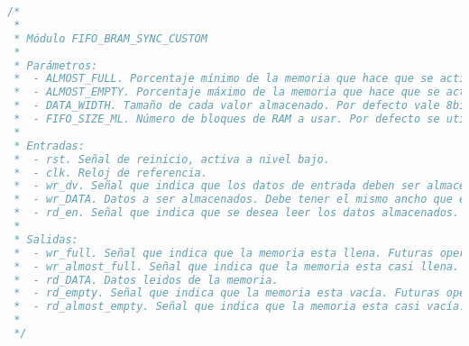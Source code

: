 \begin{lstlisting}[language=Verilog,
    caption={Parámetros, entradas y salidas del módulo FIFO\_BRAM\_SYNC\_CUSTOM.},
    label=src:resultados-modulos-fifo]
/*
 *
 * Módulo FIFO_BRAM_SYNC_CUSTOM
 *
 * Parámetros:
 *  - ALMOST_FULL. Porcentaje mínimo de la memoria que hace que se active la señal wr_almost_full. Por defecto vale 0.9.
 *  - ALMOST_EMPTY. Porcentaje máximo de la memoria que hace que se active la señal rd_almost_empty. Por defecto vale 0.1.
 *  - DATA_WIDTH. Tamaño de cada valor almacenado. Por defecto vale 8bits.
 *  - FIFO_SIZE_ML. Número de bloques de RAM a usar. Por defecto se utiliza uno.
 *
 * Entradas:
 *  - rst. Señal de reinicio, activa a nivel bajo.
 *  - clk. Reloj de referencia.
 *  - wr_dv. Señal que indica que los datos de entrada deben ser almacenados.
 *  - wr_DATA. Datos a ser almacenados. Debe tener el mismo ancho que el parámetro DATA_WIDTH.
 *  - rd_en. Señal que indica que se desea leer los datos almacenados.
 *
 * Salidas:
 *  - wr_full. Señal que indica que la memoria esta llena. Futuras operaciones de escritura serán ignoradas.
 *  - wr_almost_full. Señal que indica que la memoria esta casi llena.
 *  - rd_DATA. Datos leidos de la memoria.
 *  - rd_empty. Señal que indica que la memoria esta vacía. Futuras operaciones de lectura serán ignoradas.
 *  - rd_almost_empty. Señal que indica que la memoria esta casi vacía.
 *
 */
\end{lstlisting}

